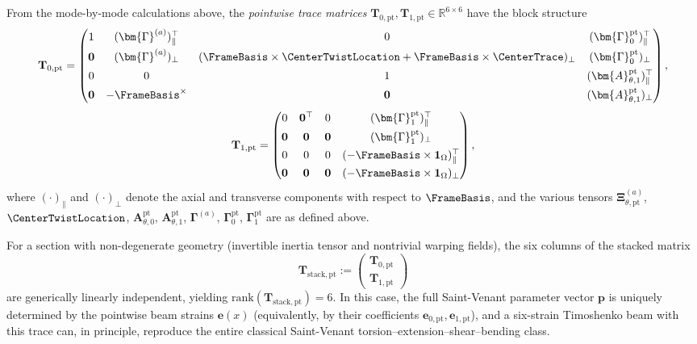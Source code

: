 From the mode-by-mode calculations above, the \emph{pointwise trace matrices} 
$\mathbf{T}_{0,\mathrm{pt}},\mathbf{T}_{1,\mathrm{pt}} \in \mathbb{R}^{6\times 6}$ 
have the block structure
\begin{equation}
\mathbf{T}_{0,\mathrm{pt}} = 
\begin{pmatrix}
1 & (\bm{\Gamma}^{(a)})_\parallel^\top & 0 & (\bm{\Gamma}^{\mathrm{pt}}_0)_\parallel^\top \\[4pt]
\mathbf{0} & (\bm{\Gamma}^{(a)})_\perp & (\FrameBasis \times \CenterTwistLocation + \FrameBasis \times \CenterTrace)_\perp & (\bm{\Gamma}^{\mathrm{pt}}_0)_\perp \\[4pt]
0 & 0 & 1 & (\bm{A}_{\theta,1}^{\mathrm{pt}})_\parallel^\top \\[4pt]
\mathbf{0} & -\FrameBasis^{\times} & \mathbf{0} & (\bm{A}_{\theta,1}^{\mathrm{pt}})_\perp
\end{pmatrix},
\label{eq:T0-pointwise}
\end{equation}
\begin{equation}
\mathbf{T}_{1,\mathrm{pt}} = 
\begin{pmatrix}
0 & \mathbf{0}^\top & 0 & (\bm{\Gamma}^{\mathrm{pt}}_1)_\parallel^\top \\[4pt]
\mathbf{0} & \mathbf{0} & \mathbf{0} & (\bm{\Gamma}^{\mathrm{pt}}_1)_\perp \\[4pt]
0 & 0 & 0 & (-\FrameBasis \times \mathbf{1}_\Omega)_\parallel^\top \\[4pt]
\mathbf{0} & \mathbf{0} & \mathbf{0} & (-\FrameBasis \times \mathbf{1}_\Omega)_\perp
\end{pmatrix},
\label{eq:T1-pointwise}
\end{equation}
where $(\cdot)_\parallel$ and $(\cdot)_\perp$ denote the axial and transverse 
components with respect to $\FrameBasis$, and the various tensors
$\bm{\Xi}^{(a)}_{\theta,\mathrm{pt}}$, 
$\CenterTwistLocation$, 
$\bm{A}_{\theta,0}^{\mathrm{pt}}$, 
$\bm{A}_{\theta,1}^{\mathrm{pt}}$, 
$\bm{\Gamma}^{(a)}$, 
$\bm{\Gamma}^{\mathrm{pt}}_0$, 
$\bm{\Gamma}^{\mathrm{pt}}_1$
are as defined above.

\begin{remark}
For a section with non-degenerate geometry (invertible inertia tensor and 
nontrivial warping fields), the six columns of the stacked matrix
\begin{equation}
\mathbf{T}_{\mathrm{stack,pt}}
:=
\begin{pmatrix}
\mathbf{T}_{0,\mathrm{pt}} \\[2pt]
\mathbf{T}_{1,\mathrm{pt}}
\end{pmatrix}
\end{equation}
are generically linearly independent, yielding 
$\mathrm{rank}(\mathbf{T}_{\mathrm{stack,pt}})=6$. 
In this case, the full Saint-Venant parameter vector 
$\bm{p}$ is uniquely determined by the pointwise beam strains 
$\bm{e}(x)$ (equivalently, by their coefficients 
$\bm{e}_{0,\mathrm{pt}},\bm{e}_{1,\mathrm{pt}}$), and a six-strain Timoshenko 
beam with this trace can, in principle, reproduce the entire classical 
Saint-Venant torsion–extension–shear–bending class.
\end{remark}
